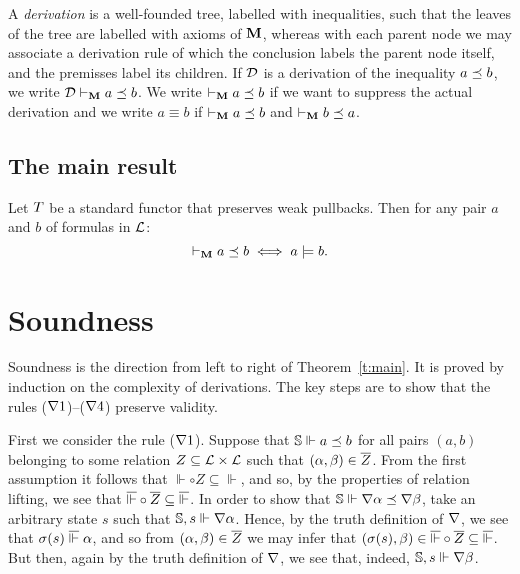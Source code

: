 \documentclass{book}
\begin{document}
\begin{definition}
A \emph{derivation} is a well-founded tree, labelled with
inequalities, such that the leaves of the tree are labelled with
axioms of $\mathbf{M}$, whereas with each parent node we may associate a
derivation rule of which the conclusion labels the parent node itself,
and the premisses label its children.  If $\mathcal{D}$ is a derivation of the
inequality $a\preceq b$, we write $\mathcal{D} \vdash_{\mathbf{M}} a \preceq b$.  We
write $\vdash_{\mathbf{M}} a \preceq b$ if we want to suppress the actual
derivation and we write $a \equiv b$ if $\vdash_{\mathbf{M}} a \preceq b$ and
$\vdash_{\mathbf{M}} b \preceq a$.
\end{definition}


\subsection*{The main result}

\begin{theorem}
\label{t:main}
Let $T$ be a standard functor that preserves weak pullbacks. 
Then for any pair $a$ and $b$ of formulas in $\mathcal{L}$:
\[
\vdash_{\mathbf{M}} a \preceq b
\iff
 a \models b.
\]
\end{theorem}




%
\section{Soundness}
\label{s:sound}

Soundness is the direction from left to right of Theorem~\ref{t:main}.
It is proved by induction on the complexity of
derivations.
The key steps are to show that the rules ($\nabla1$)--($\nabla4$)
preserve validity.

First we consider the rule ($\nabla1$).  Suppose that $\mathbb{S}
\Vdash a \preceq b$ for all pairs $(a,b)$ belonging to some relation
$Z \subseteq \mathcal{L}\times\mathcal{L}$ such that $(\alpha,\beta) \in
\overline{Z}$.  From the first assumption it follows that ${\Vdash}\circ
Z \subseteq {\Vdash}$, and so, by the properties of relation lifting,
we see that $\overline{\Vdash} \circ \overline{Z} \subseteq
\overline{\Vdash}$.  In order to show that $\mathbb{S} \Vdash
\nabla\alpha \preceq \nabla\beta$, take an arbitrary state $s$
such that $\mathbb{S},s \Vdash \nabla\alpha$.  Hence, by the truth
definition of $\nabla$, we see that $\sigma(s)\;\overline{\Vdash}\;
\alpha$, and so from $(\alpha,\beta) \in \overline{Z}$ we may infer that
$(\sigma(s),\beta) \in \overline{\Vdash} \circ \overline{Z} \subseteq
\overline{\Vdash}$.  But then, again by the truth definition of
$\nabla$, we see that, indeed, $\mathbb{S},s \Vdash \nabla\beta$.
\end{document}
